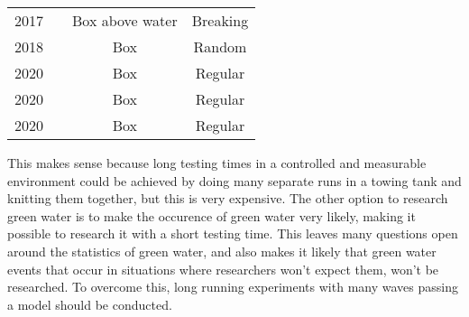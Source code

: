 \begin{table}[]
\begin{tabular}{ll|cc}
		2017                                   & \citet{Scharnke2017}                            & Box above water                                         & Breaking                                \\
		2018                                   & \citet{Chuang2018}                              & Box                                         & Random                               \\
		2020                                   & \citet{Lee2020}                                 & Box                                         & Regular                                 \\
		2020                                   & \citet{Hernandez-Fontes2020}                    & Box                                         & Regular                               \\
		2020                                   & \citet{Hernandez-Fontes2020a}                   & Box                                         & Regular                                  
	\end{tabular}
	\label{tab:setup2_all_exp_greenwater}
\end{table}
 
This makes sense because long testing times in a controlled and measurable environment could be achieved by doing many separate runs in a towing tank and knitting them together, but this is very expensive. The other option to research green water is to make the occurence of green water very likely, making it possible to research it with a short testing time. This leaves many questions open around the statistics of green water, and also makes it likely that green water events that occur in situations where researchers won't expect them, won't be researched. To overcome this, long running experiments with many waves passing a model should be conducted.  \par 

